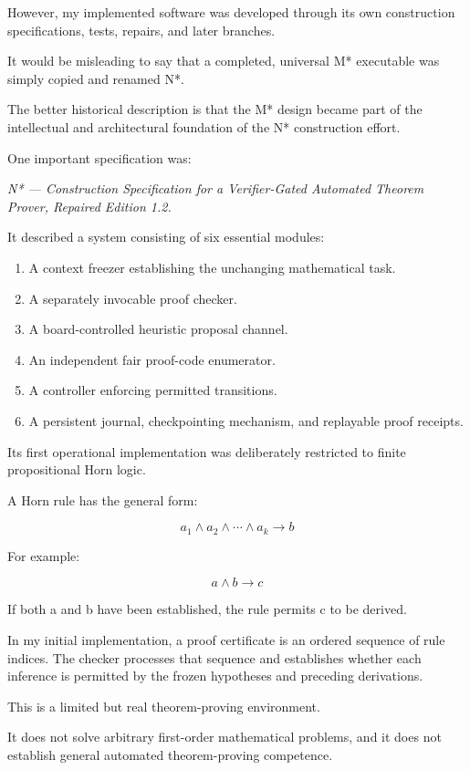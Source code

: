 \documentclass[11pt,letterpaper]{article}
\providecommand{\tightlist}{\setlength{\itemsep}{0pt}\setlength{\parskip}{0pt}}
\begin{document}
However, my implemented software was developed through its own construction specifications, tests, repairs, and later branches.

It would be misleading to say that a completed, universal M* executable was simply copied and renamed N*.

The better historical description is that the M* design became part of the intellectual and architectural foundation of the N* construction effort.

One important specification was:

\emph{N* --- Construction Specification for a Verifier-Gated Automated Theorem Prover, Repaired Edition 1.2.}

It described a system consisting of six essential modules:

\begin{enumerate}
\def\labelenumi{\arabic{enumi}.}
\tightlist
\item
  A context freezer establishing the unchanging mathematical task.
\item
  A separately invocable proof checker.
\item
  A board-controlled heuristic proposal channel.
\item
  An independent fair proof-code enumerator.
\item
  A controller enforcing permitted transitions.
\item
  A persistent journal, checkpointing mechanism, and replayable proof receipts.
\end{enumerate}

Its first operational implementation was deliberately restricted to finite propositional Horn logic.

A Horn rule has the general form:

\[a_1\wedge a_2\wedge\cdots\wedge a_k\to b\]

For example:

\[a\wedge b\to c\]

If both a and b have been established, the rule permits c to be derived.

In my initial implementation, a proof certificate is an ordered sequence of rule indices. The checker processes that sequence and establishes whether each inference is permitted by the frozen hypotheses and preceding derivations.

This is a limited but real theorem-proving environment.

It does not solve arbitrary first-order mathematical problems, and it does not establish general automated theorem-proving competence.
\end{document}
